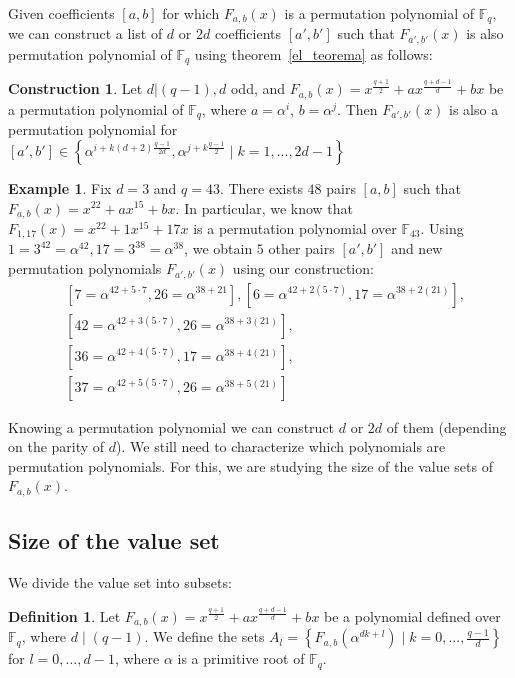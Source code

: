 \documentclass{article}
\theoremstyle{definition}
\newtheorem{definition}[theorem]{Definition}
\newtheorem{example}[theorem]{Example}
\newtheorem{construction}[theorem]{Construction}
\theoremstyle{remark}
\numberwithin{equation}{section}
\begin{document}
    Given coefficients $[a,b]$ for which $F_{a,b}(x)$ is a permutation polynomial of $\mathbb{F}_q$, we can construct a list of $d$ or $2d$ coefficients $[a',b']$ such that $F_{a',b'}(x)$ is also permutation polynomial of $\mathbb{F}_q$ using theorem~\ref{el_teorema} as follows:


\begin{construction} Let $d|(q-1), d$ odd, and $F_{a,b}(x) = x^{\frac{q+1}{2}} + a x^{\frac{q+d-1}{d}} + b x$ be a permutation polynomial of $\mathbb{F}_{q}$, where $a=\alpha^i$, $b=\alpha^j$. Then $F_{a',b'}(x)$ is also a permutation polynomial for $[a',b'] \in \left\{ \alpha^{i+k (d+2) \frac{q-1}{2d}}, \alpha^{j+k \frac{q-1}{2}} \mid k=1,...,2d-1 \right\}$
\end{construction}

    \begin{example}
      Fix $d = 3$ and $q = 43$. There exists $48$ pairs $[a,b]$ such that $F_{a,b}(x) = x^{22} + a x^{15} + b x$. In particular, we know that $F_{1,17}(x) = x^{22} + 1 x^{15} + 17 x$  is a permutation polynomial over $\mathbb{F}_{43}$. Using $1=3^{42}=\alpha^{42}, 17= 3^{38}=\alpha^{38}$, we obtain $5$ other pairs $[a', b']$ and new permutation polynomials $F_{a',b'}(x)$ using our construction:
      \begin{align*}
        &[7=\alpha^{42+5\cdot 7},26=\alpha^{38+21}], [6=\alpha^{42+2(5\cdot 7)},17=\alpha^{38+2(21)}], \\
        &[42=\alpha^{42+3(5\cdot 7)},26=\alpha^{38+3(21)}], \\
        &[36=\alpha^{42+4(5\cdot 7)},17=\alpha^{38+4(21)}], \\ 
        &[37=\alpha^{42+5(5\cdot 7)},26=\alpha^{38+5(21)}]
      \end{align*}
    \end{example}

Knowing a permutation polynomial we can construct $d$ or $2d$ of them (depending on the parity of $d$). We still need to characterize which polynomials are permutation polynomials. For this,  we are studying the size of the value sets of $F_{a,b}(x)$. 

\subsection{Size of the value set}

We divide the value set into subsets:

  \begin{definition}
      Let $F_{a,b}(x) = x^{\frac{q+1}{2}} + a x^{\frac{q+d-1}{d}} + b x$ be a polynomial defined over $\mathbb{F}_{q}$, where $d \mid (q-1)$. We define the sets $A_l = \left\{F_{a,b}(\alpha^{d k+l}) \mid k=0,...,\frac{q-1}{d}\right\}$ for $l=0,...,d-1$, where $\alpha$ is a primitive root of $\mathbb{F}_{q}$.
    \end{definition}
\end{document}
